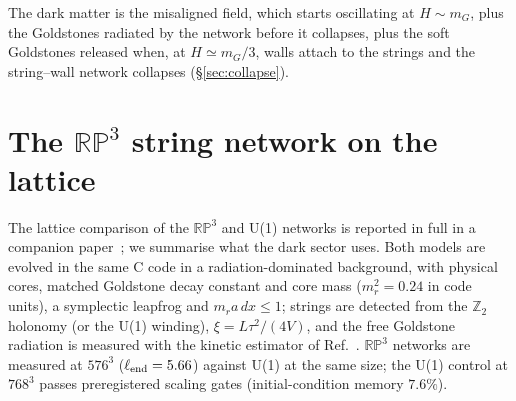 \documentclass[11pt,a4paper]{article}
\newcommand{\RP}{\mathbb{RP}^3}
\newcommand{\Ztwo}{\mathbb{Z}_2}
\begin{document}
The dark matter is the misaligned field, which starts oscillating at $H\sim m_G$, plus the Goldstones radiated by the network before it collapses, plus the soft Goldstones released when, at $H\simeq m_G/3$, walls attach to the strings and the string--wall network collapses (\S\ref{sec:collapse}).

\section{The $\RP$ string network on the lattice}
\label{sec:network}

The lattice comparison of the $\RP$ and U(1) networks is reported in full in a companion paper~\cite{rp3_paper}; we summarise what the dark sector uses.
Both models are evolved in the same C code in a radiation-dominated background, with physical cores, matched Goldstone decay constant and core mass ($m_r^2=0.24$ in code units), a symplectic leapfrog and $m_r a\,dx\le1$; strings are detected from the $\Ztwo$ holonomy (or the U(1) winding), $\xi=L\tau^2/(4V)$, and the free Goldstone radiation is measured with the kinetic estimator of Ref.~\cite{GHV2018}.
$\RP$ networks are measured at $576^3$ ($\ell_{\rm end}=5.66$) against U(1) at the same size; the U(1) control at $768^3$ passes preregistered scaling gates (initial-condition memory $7.6\%$).
\end{document}
